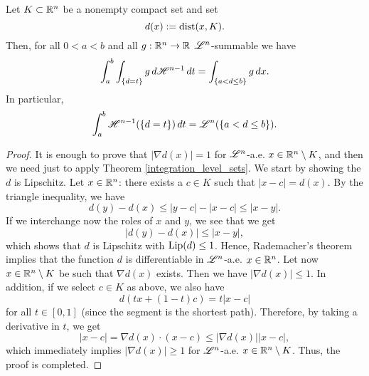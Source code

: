 \begin{theorem} \label{integration_distance_function}
Let $K\subset \mathbb{R}^{n}$ be a nonempty compact set and set $$d(x):= {\rm dist}(x, K).$$
Then, for all $0 < a < b$ and all $g : \mathbb{R}^{n} \to \mathbb{R}$ $\mathscr{L}^{n}$-summable we have
\begin{equation*}
\int_{a}^{b} \int_{\{ d = t\}} g \, d \mathscr{H}^{n - 1} \, dt = \int_{\{ a < d \le b\}} g \, dx.
\end{equation*}
In particular,
\begin{equation*}
\int_{a}^{b} \mathscr{H}^{n - 1}(\{d = t\}) \, dt = \mathscr{L}^{n}(\{ a < d \le b\}).
\end{equation*}
\end{theorem}
\begin{proof}
It is enough to prove that $|\nabla d(x)| = 1$ for $\mathscr{L}^{n}$-a.e. $x \in \mathbb{R}^{n} \setminus K$, and then we need just to apply Theorem \ref{integration_level_sets}. We start by showing the $d$ is Lipschitz. Let $x \in \mathbb{R}^{n}$: there exists a $c \in K$ such that $|x - c| = d(x)$. By the triangle inequality, we have
\begin{equation*}
d(y) - d(x) \le |y - c| - |x - c| \le |x - y|.
\end{equation*}
If we interchange now the roles of $x$ and $y$, we see that we get 
\begin{equation*}
|d(y) - d(x)| \le |x - y|,
\end{equation*}
which shows that $d$ is Lipschitz with $\operatorname{Lip}(d) \le 1$. Hence, Rademacher's theorem implies that the function $d$ is differentiable in $\mathscr{L}^{n}$-a.e. $x \in \mathbb{R}^n$. Let now $x \in \mathbb{R}^{n} \setminus K$ be such that $\nabla d(x)$ exists. Then we have $|\nabla d(x)| \le 1$. In addition, if we select $c \in K$ as above, we also have
\begin{equation*}
d(tx + (1 - t)c) = t |x - c|
\end{equation*}
for all $t \in [0, 1]$ (since the segment is the shortest path). Therefore, by taking a derivative in $t$, we get
\begin{equation*}
|x - c| = \nabla d(x) \cdot (x - c) \le |\nabla d(x)| |x - c|,
\end{equation*}
which immediately implies $|\nabla d(x)| \ge 1$ for $\mathscr{L}^{n}$-a.e. $x \in \mathbb{R}^{n} \setminus K$. Thus, the proof is completed.
\end{proof}